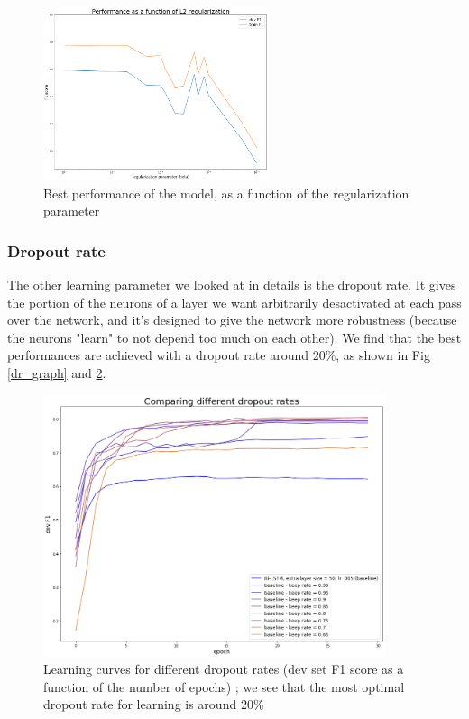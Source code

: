 \documentclass{article} %
\begin{document}
\begin{figure}
\begin{center}
\includegraphics[width=250px]{figs/l2_graph.png}
\caption{Best performance of the model, as a function of the regularization parameter}
\label{l2_graph}
\end{center}
\end{figure}

\subsubsection{Dropout rate}

The other learning parameter we looked at in details is the dropout rate. It gives the portion of the neurons of a layer we want arbitrarily desactivated at each pass over the network, and it's designed to give the network more robustness (because the neurons "learn" to not depend too much on each other). We find that the best performances are achieved with a dropout rate around 20\%, as shown in Fig \ref{dr_graph} and \ref{dr_devf1}.

\begin{figure}
\begin{center}
\includegraphics[width=380px]{figs/dr_devf1.png}
\caption{Learning curves for different dropout rates (dev set F1 score as a function of the number of epochs) ; we see that the most optimal dropout rate for learning is around 20\%}
\label{dr_devf1}
\end{center}
\end{figure}
\end{document}
